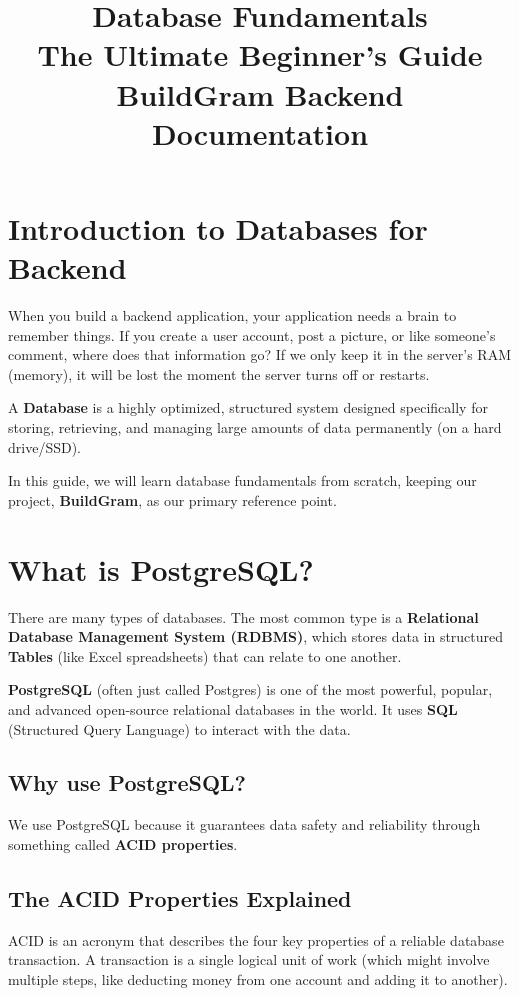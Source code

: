 \documentclass[11pt,a4paper]{article}
\title{\vspace{-1.5cm}\textbf{\Huge Database Fundamentals} \\ \vspace{0.5cm} \Large The Ultimate Beginner's Guide \\ \vspace{0.2cm} \large BuildGram Backend Documentation}
\author{}
\date{}
\begin{document}
\maketitle
\tableofcontents
\newpage

\section{Introduction to Databases for Backend}
When you build a backend application, your application needs a brain to remember things. If you create a user account, post a picture, or like someone's comment, where does that information go? If we only keep it in the server's RAM (memory), it will be lost the moment the server turns off or restarts. 

A \textbf{Database} is a highly optimized, structured system designed specifically for storing, retrieving, and managing large amounts of data permanently (on a hard drive/SSD).

In this guide, we will learn database fundamentals from scratch, keeping our project, \textbf{BuildGram}, as our primary reference point.

\section{What is PostgreSQL?}
There are many types of databases. The most common type is a \textbf{Relational Database Management System (RDBMS)}, which stores data in structured \textbf{Tables} (like Excel spreadsheets) that can relate to one another.

\textbf{PostgreSQL} (often just called Postgres) is one of the most powerful, popular, and advanced open-source relational databases in the world. It uses \textbf{SQL} (Structured Query Language) to interact with the data. 

\subsection{Why use PostgreSQL?}
We use PostgreSQL because it guarantees data safety and reliability through something called \textbf{ACID properties}.

\subsection{The ACID Properties Explained}
ACID is an acronym that describes the four key properties of a reliable database transaction. A transaction is a single logical unit of work (which might involve multiple steps, like deducting money from one account and adding it to another).
\end{document}

